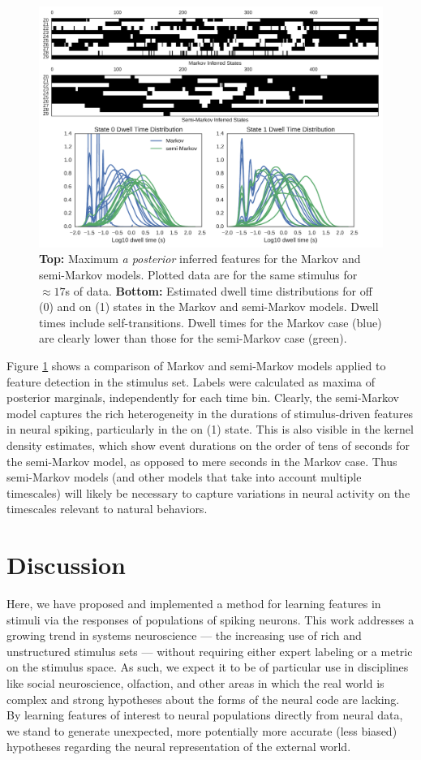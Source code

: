 \documentclass{article} %
\begin{document}
\begin{figure}[ht]
    \center
    \includegraphics[width=0.6\linewidth]{figures/movie_data}
    \caption{\textbf{Top:} Maximum \emph{a posterior} inferred features for the Markov and semi-Markov models. Plotted data are for the same stimulus for $\approx 17$s of data. \textbf{Bottom:} Estimated dwell time distributions for off (0) and on (1) states in the Markov and semi-Markov models. Dwell times include self-transitions. Dwell times for the Markov case (blue) are clearly lower than those for the semi-Markov case (green).}
    \label{movie_results}
\end{figure}

Figure \ref{movie_results} shows a comparison of Markov and semi-Markov models applied to feature detection in the stimulus set. Labels were calculated as maxima of posterior marginals, independently for each time bin. Clearly, the semi-Markov model captures the rich heterogeneity in the durations of stimulus-driven features in neural spiking, particularly in the on (1) state. This is also visible in the kernel density estimates, which show event durations on the order of tens of seconds for the semi-Markov model, as opposed to mere seconds in the Markov case. Thus semi-Markov models (and other models that take into account multiple timescales) will likely be necessary to capture variations in neural activity on the timescales relevant to natural behaviors.

\section{Discussion}
Here, we have proposed and implemented a method for learning features in stimuli via the responses of populations of spiking neurons. This work addresses a growing trend in systems neuroscience --- the increasing use of rich and unstructured stimulus sets --- without requiring either expert labeling or a metric on the stimulus space. As such, we expect it to be of particular use in disciplines like social neuroscience, olfaction, and other areas in which the real world is complex and strong hypotheses about the forms of the neural code are lacking. By learning features of interest to neural populations directly from neural data, we stand to generate unexpected, more potentially more accurate (less biased) hypotheses regarding the neural representation of the external world.  
\end{document}
